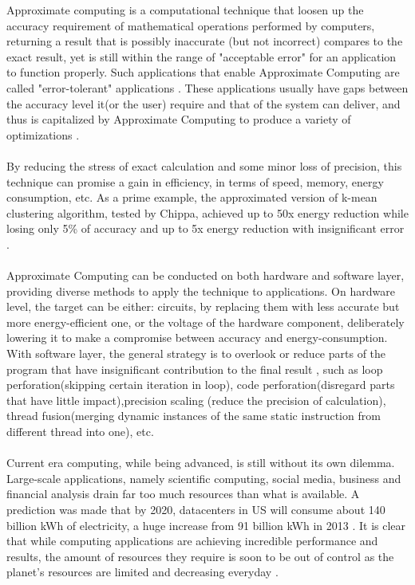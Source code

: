 Approximate computing is a computational technique that loosen up the accuracy requirement of mathematical operations performed by computers, returning a result that is possibly inaccurate (but not incorrect) compares to the exact result, yet is still within the range of "acceptable error" for an application to function properly. Such applications that enable Approximate Computing are called "error-tolerant" applications \cite{7348659}. These applications usually have gaps between the accuracy level it(or the user) require and that of the system can deliver, and thus is capitalized by Approximate Computing to produce a variety of optimizations \cite{AxCSurvey}. \\
~\\
By reducing the stress of exact calculation and some minor loss of precision, this technique can promise a gain in efficiency, in terms of speed, memory, energy consumption, etc. As a prime example, the approximated version of k-mean clustering algorithm, tested by Chippa, achieved up to 50x energy reduction while losing only 5\% of accuracy and up to 5x energy reduction with insignificant error \cite{SEHD}.\\
~\\
Approximate Computing can be conducted on both hardware and software layer, providing diverse methods to apply the technique to applications. On hardware level, the target can be either: circuits, by replacing them with less accurate but more energy-efficient one, or the voltage of the hardware component, deliberately lowering it to make a compromise between accuracy and energy-consumption. With software layer, the general strategy is to overlook or reduce parts of the program that have insignificant contribution to the final result \cite{7348659}, such as loop perforation(skipping certain iteration in loop), code perforation(disregard parts that have little impact),precision scaling (reduce the precision of calculation), thread fusion(merging dynamic instances of the same static instruction from different thread into one), etc.\\
~\\
%
Current era computing, while being advanced, is still without its own dilemma. Large-scale applications, namely scientific computing, social media, business and financial analysis drain far too much resources than what is available. A prediction was made that by 2020, datacenters in US will consume about 140 billion kWh of electricity, a huge increase from 91 billion kWh in 2013 \cite{NRDC}. It is clear that while computing applications are achieving incredible performance and results, the amount of resources they require is soon to be out of control as the planet's resources are limited and decreasing everyday \cite{AxCSurvey}. \\
